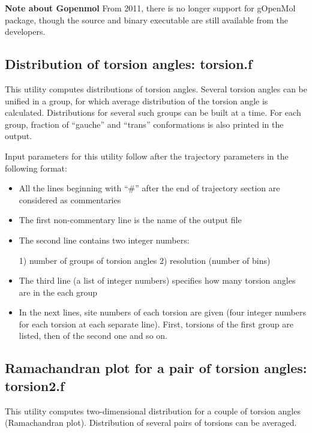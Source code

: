 \documentclass{article}
\begin{document}
{\bf Note about Gopenmol} From 2011, there is no longer support for 
gOpenMol package, though the source and binary executable are still 
available from the developers.   

\subsection{Distribution of torsion angles:  torsion.f}

This utility computes distributions of torsion angles.
Several torsion angles can be unified in a group,
for which average distribution of the torsion angle is calculated.
Distributions for several such groups can be built at a time.
For each group, fraction of ``gauche'' and ``trans'' conformations is
also printed in the output.

Input parameters for this utility follow after the trajectory parameters
in the following format:

\begin{itemize}

\item
All the lines beginning with ``\#'' after the end of trajectory section
are considered as commentaries

\item
The first non-commentary line is the name of the output file 

\item
The second line contains two integer numbers:

1) number of groups of torsion angles
2) resolution (number of bins) 

\item
The third line (a list of integer numbers) specifies how many torsion 
angles are in the each group

\item
In the next lines, site numbers of each torsion are given (four integer 
numbers for each  torsion at each separate line). First, torsions of the
first group are listed, then of the second one and so on.

\end{itemize}

\subsection{Ramachandran plot for a pair of torsion angles:  torsion2.f}

This utility computes two-dimensional distribution for a couple
of torsion angles (Ramachandran plot). Distribution of several pairs 
of torsions can be averaged.
\end{document}
